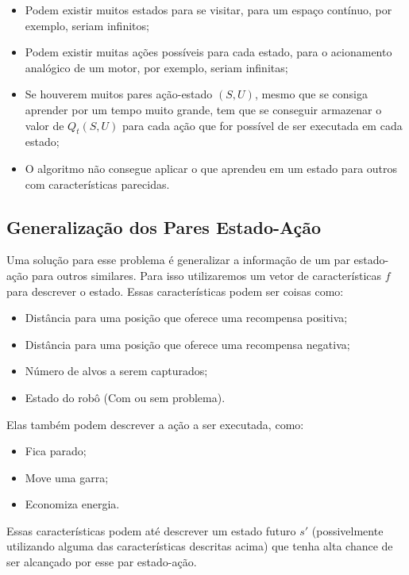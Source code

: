 \begin{itemize}
	\item Podem existir muitos estados para se visitar, para um espaço contínuo, por exemplo, seriam infinitos;
	\item Podem existir muitas ações possíveis para cada estado, para o acionamento analógico de um motor, por exemplo, seriam infinitas;
	\item Se houverem muitos pares ação-estado $ \left( S, U \right) $, mesmo que se consiga aprender por um tempo muito grande, tem que se conseguir armazenar o valor de $ Q_t \left( S, U \right) $ para cada ação que for possível de ser executada em cada estado;
	\item O algoritmo não consegue aplicar o que aprendeu em um estado para outros com características parecidas.
\end{itemize}

\subsection{Generalização dos Pares Estado-Ação} \label{subsection:GeneralizaçãoParesEstadoAção}

Uma solução para esse problema é generalizar a informação de um par estado-ação para outros similares. Para isso utilizaremos um vetor de características $ f $ para descrever o estado. Essas características podem ser coisas como:

\begin{itemize}
	\item Distância para uma posição que oferece uma recompensa positiva;
	\item Distância para uma posição que oferece uma recompensa negativa;
	\item Número de alvos a serem capturados;
	\item Estado do robô (Com ou sem problema).
\end{itemize}

Elas também podem descrever a ação a ser executada, como:

\begin{itemize}
	\item Fica parado;
	\item Move uma garra;
	\item Economiza energia.
\end{itemize}

Essas características podem até descrever um estado futuro $ s' $ (possivelmente utilizando alguma das características descritas acima) que tenha alta chance de ser alcançado por esse par estado-ação.

